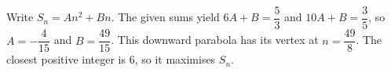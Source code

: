 Write $S_n=An^2+Bn$. The given sums yield $6A+B=\dfrac{5}{3}$ and $10A+B=\dfrac{3}{5}$, so $A=-\dfrac{4}{15}$ and $B=\dfrac{49}{15}$. This downward parabola has its vertex at $n=\dfrac{49}{8}$. The closest positive integer is $\boxed6$, so it maximises $S_n$.
